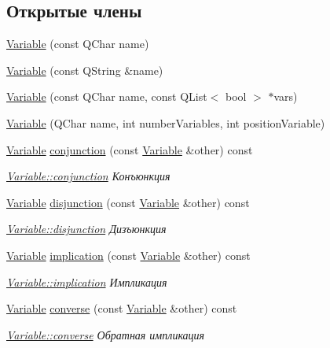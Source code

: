 \subsection*{Открытые члены}
\begin{DoxyCompactItemize}
\item 
\hyperlink{class_variable_abef86be74e8dfb025fdeaf18048e9922}{Variable} (const Q\+Char name)
\item 
\hyperlink{class_variable_ae347cff8c66e1fb58b5fd90b9f19956a}{Variable} (const Q\+String \&name)
\item 
\hyperlink{class_variable_af3512a97c66e98c40a4aa69c9d65e22a}{Variable} (const Q\+Char name, const Q\+List$<$ bool $>$ $\ast$vars)
\item 
\hyperlink{class_variable_af55f1231f40b8fc1bb6fbca091a43c83}{Variable} (Q\+Char name, int number\+Variables, int position\+Variable)
\item 
\hyperlink{class_variable}{Variable} \hyperlink{class_variable_a3072441748b17a105aea1485911bb489}{conjunction} (const \hyperlink{class_variable}{Variable} \&other) const
\begin{DoxyCompactList}\small\item\em \hyperlink{class_variable_a3072441748b17a105aea1485911bb489}{Variable\+::conjunction} Конъюнкция \end{DoxyCompactList}\item 
\hyperlink{class_variable}{Variable} \hyperlink{class_variable_a2e4849eea01ce6e2ec9ba143164e7d57}{disjunction} (const \hyperlink{class_variable}{Variable} \&other) const
\begin{DoxyCompactList}\small\item\em \hyperlink{class_variable_a2e4849eea01ce6e2ec9ba143164e7d57}{Variable\+::disjunction} Дизъюнкция \end{DoxyCompactList}\item 
\hyperlink{class_variable}{Variable} \hyperlink{class_variable_a82a20d70ad58a132b487a7bc822b47d1}{implication} (const \hyperlink{class_variable}{Variable} \&other) const
\begin{DoxyCompactList}\small\item\em \hyperlink{class_variable_a82a20d70ad58a132b487a7bc822b47d1}{Variable\+::implication} Импликация \end{DoxyCompactList}\item 
\hyperlink{class_variable}{Variable} \hyperlink{class_variable_adb62912a5e9433289191879e6bb7d580}{converse} (const \hyperlink{class_variable}{Variable} \&other) const
\begin{DoxyCompactList}\small\item\em \hyperlink{class_variable_adb62912a5e9433289191879e6bb7d580}{Variable\+::converse} Обратная импликация \end{DoxyCompactList}\item 

\end{DoxyCompactItemize}
